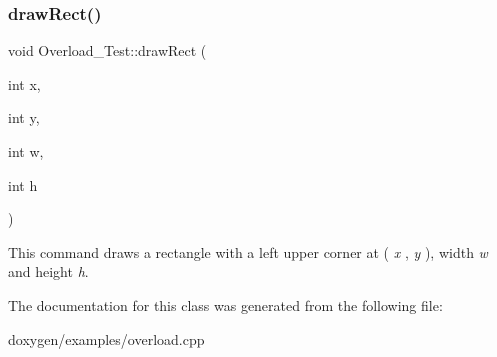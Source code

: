 \subsubsection{\texorpdfstring{drawRect()}{drawRect()}\hspace{0.1cm}{\footnotesize\ttfamily [2/2]}}
{\footnotesize\ttfamily void Overload\+\_\+\+Test\+::draw\+Rect (\begin{DoxyParamCaption}\item[{int}]{x,  }\item[{int}]{y,  }\item[{int}]{w,  }\item[{int}]{h }\end{DoxyParamCaption})}

This command draws a rectangle with a left upper corner at ( {\itshape x} , {\itshape y} ), width {\itshape w} and height {\itshape h}. 

The documentation for this class was generated from the following file\+:\begin{DoxyCompactItemize}
\item 
doxygen/examples/overload.\+cpp\end{DoxyCompactItemize}
